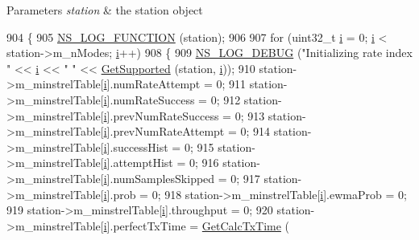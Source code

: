 \begin{DoxyParams}{Parameters}
{\em station} & the station object \\
\hline
\end{DoxyParams}

\begin{DoxyCode}
904 \{
905   \hyperlink{log-macros-disabled_8h_a90b90d5bad1f39cb1b64923ea94c0761}{NS\_LOG\_FUNCTION} (station);
906 
907   \textcolor{keywordflow}{for} (uint32\_t \hyperlink{bernuolliDistribution_8m_a6f6ccfcf58b31cb6412107d9d5281426}{i} = 0; \hyperlink{bernuolliDistribution_8m_a6f6ccfcf58b31cb6412107d9d5281426}{i} < station->m\_nModes; \hyperlink{bernuolliDistribution_8m_a6f6ccfcf58b31cb6412107d9d5281426}{i}++)
908     \{
909       \hyperlink{group__logging_ga413f1886406d49f59a6a0a89b77b4d0a}{NS\_LOG\_DEBUG} (\textcolor{stringliteral}{"Initializing rate index "} << \hyperlink{bernuolliDistribution_8m_a6f6ccfcf58b31cb6412107d9d5281426}{i} << \textcolor{stringliteral}{" "} << 
      \hyperlink{classns3_1_1WifiRemoteStationManager_a995c8bae0d84b168fd3e8bc9ecaacdd4}{GetSupported} (station, \hyperlink{bernuolliDistribution_8m_a6f6ccfcf58b31cb6412107d9d5281426}{i}));
910       station->m\_minstrelTable[\hyperlink{bernuolliDistribution_8m_a6f6ccfcf58b31cb6412107d9d5281426}{i}].numRateAttempt = 0;
911       station->m\_minstrelTable[\hyperlink{bernuolliDistribution_8m_a6f6ccfcf58b31cb6412107d9d5281426}{i}].numRateSuccess = 0;
912       station->m\_minstrelTable[\hyperlink{bernuolliDistribution_8m_a6f6ccfcf58b31cb6412107d9d5281426}{i}].prevNumRateSuccess = 0;
913       station->m\_minstrelTable[\hyperlink{bernuolliDistribution_8m_a6f6ccfcf58b31cb6412107d9d5281426}{i}].prevNumRateAttempt = 0;
914       station->m\_minstrelTable[\hyperlink{bernuolliDistribution_8m_a6f6ccfcf58b31cb6412107d9d5281426}{i}].successHist = 0;
915       station->m\_minstrelTable[\hyperlink{bernuolliDistribution_8m_a6f6ccfcf58b31cb6412107d9d5281426}{i}].attemptHist = 0;
916       station->m\_minstrelTable[\hyperlink{bernuolliDistribution_8m_a6f6ccfcf58b31cb6412107d9d5281426}{i}].numSamplesSkipped = 0;
917       station->m\_minstrelTable[\hyperlink{bernuolliDistribution_8m_a6f6ccfcf58b31cb6412107d9d5281426}{i}].prob = 0;
918       station->m\_minstrelTable[\hyperlink{bernuolliDistribution_8m_a6f6ccfcf58b31cb6412107d9d5281426}{i}].ewmaProb = 0;
919       station->m\_minstrelTable[\hyperlink{bernuolliDistribution_8m_a6f6ccfcf58b31cb6412107d9d5281426}{i}].throughput = 0;
920       station->m\_minstrelTable[\hyperlink{bernuolliDistribution_8m_a6f6ccfcf58b31cb6412107d9d5281426}{i}].perfectTxTime = \hyperlink{classns3_1_1MinstrelWifiManager_a2d62faa20d151fd80b663fcefeaa63db}{GetCalcTxTime} (

\end{DoxyCode}
